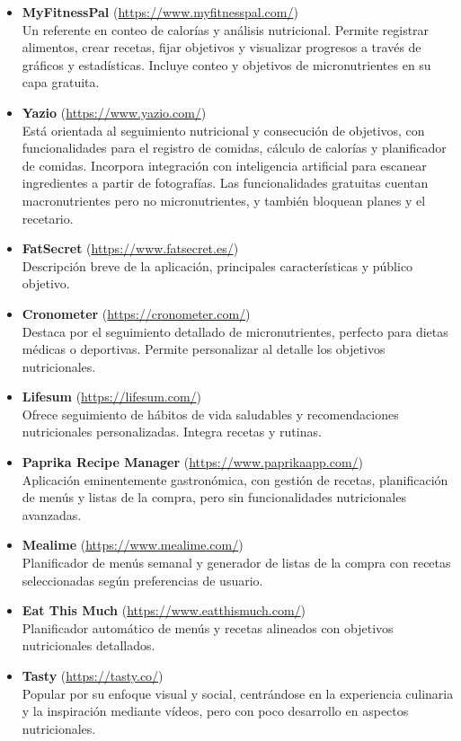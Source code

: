 \begin{itemize}
  \item \textbf{MyFitnessPal} (\url{https://www.myfitnesspal.com/})\\
  Un referente en conteo de calorías y análisis nutricional. Permite registrar alimentos, crear recetas, fijar objetivos y visualizar progresos a través de gráficos y estadísticas. Incluye conteo y objetivos de micronutrientes en su capa gratuita.

  \item \textbf{Yazio} (\url{https://www.yazio.com/})\\
  Está orientada al seguimiento nutricional y consecución de objetivos, con funcionalidades para el registro de comidas, cálculo de calorías y planificador de comidas. Incorpora integración con inteligencia artificial para escanear ingredientes a partir de fotografías. Las funcionalidades gratuitas cuentan macronutrientes pero no micronutrientes, y también bloquean planes y el recetario.

  \item \textbf{FatSecret} (\url{https://www.fatsecret.es/})\\
  Descripción breve de la aplicación, principales características y público objetivo.

  \item \textbf{Cronometer} (\url{https://cronometer.com/})\\
  Destaca por el seguimiento detallado de micronutrientes, perfecto para dietas médicas o deportivas. Permite personalizar al detalle los objetivos nutricionales.

  \item \textbf{Lifesum} (\url{https://lifesum.com/})\\
  Ofrece seguimiento de hábitos de vida saludables y recomendaciones nutricionales personalizadas. Integra recetas y rutinas.

  \item \textbf{Paprika Recipe Manager} (\url{https://www.paprikaapp.com/})\\
  Aplicación eminentemente gastronómica, con gestión de recetas, planificación de menús y listas de la compra, pero sin funcionalidades nutricionales avanzadas.

  \item \textbf{Mealime} (\url{https://www.mealime.com/})\\
  Planificador de menús semanal y generador de listas de la compra con recetas seleccionadas según preferencias de usuario.

  \item \textbf{Eat This Much} (\url{https://www.eatthismuch.com/})\\
  Planificador automático de menús y recetas alineados con objetivos nutricionales detallados.

  \item \textbf{Tasty} (\url{https://tasty.co/})\\
  Popular por su enfoque visual y social, centrándose en la experiencia culinaria y la inspiración mediante vídeos, pero con poco desarrollo en aspectos nutricionales.
\end{itemize}


